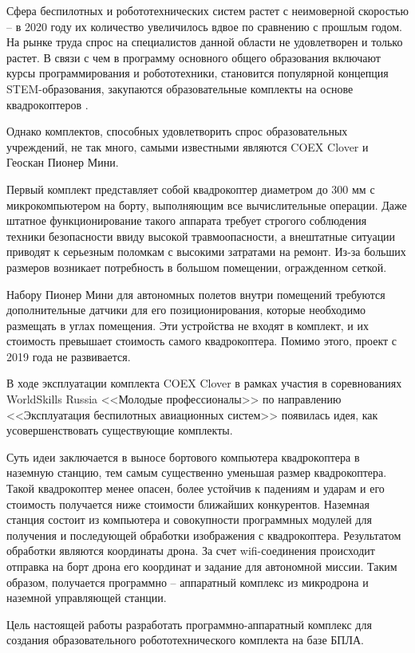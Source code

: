 Сфера беспилотных и робототехнических систем растет с неимоверной скоростью -- в 2020 году их количество увеличилось вдвое по сравнению с прошлым годом. На рынке труда спрос на специалистов данной области не удовлетворен и только растет. В связи с чем в программу основного общего образования включают курсы программирования и робототехники, становится популярной концепция STEM-образования, закупаются образовательные комплекты на основе квадрокоптеров \cite{minobr}.

Однако комплектов, способных удовлетворить спрос образовательных учреждений, не так много, самыми известными являются COEX Clover и Геоскан Пионер Мини.

Первый комплект представляет собой квадрокоптер диаметром до 300 мм с микрокомпьютером на борту, выполняющим все вычислительные операции. Даже штатное функционирование такого аппарата требует строгого соблюдения техники безопасности ввиду высокой травмоопасности, а внештатные ситуации приводят к серьезным поломкам с высокими затратами на ремонт. Из-за больших размеров возникает потребность в большом помещении, огражденном сеткой.

Набору Пионер Мини для автономных полетов внутри помещений требуются дополнительные датчики для его позиционирования, которые необходимо размещать в углах помещения. Эти устройства не входят в комплект, и их стоимость превышает стоимость самого квадрокоптера. Помимо этого, проект с 2019 года не развивается.

В ходе эксплуатации комплекта COEX Clover в рамках участия в соревнованиях WorldSkills Russia <<Молодые профессионалы>> по направлению <<Эксплуатация беспилотных авиационных систем>> появилась идея, как усовершенствовать существующие комплекты.

Суть идеи заключается в выносе бортового компьютера квадрокоптера в наземную станцию, тем самым существенно уменьшая размер квадрокоптера. Такой квадрокоптер менее опасен, более устойчив к падениям и ударам и его стоимость получается ниже стоимости ближайших конкурентов. Наземная станция состоит из компьютера и совокупности программных модулей для получения и последующей обработки изображения с квадрокоптера. Результатом обработки являются координаты дрона. За счет wifi-соединения происходит отправка на борт дрона его координат и задание для автономной миссии. Таким образом, получается программно -- аппаратный комплекс из микродрона и наземной управляющей станции.

Цель настоящей работы разработать программно-аппаратный комплекс для создания образовательного робототехнического комплекта на базе БПЛА.

